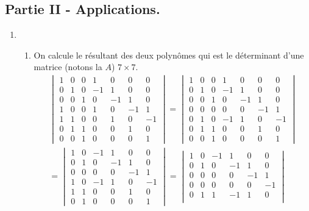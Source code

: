 \subsection*{Partie II - Applications.}
\begin{enumerate}
 \item 
\begin{enumerate}
 \item On calcule le résultant des deux polynômes qui est le déterminant d'une matrice (notons la $A$) $7\times 7$.
\begin{multline*}
 \begin{vmatrix}
1 & 0 & 0 & 1  & 0  & 0  & 0 \\
0 & 1 & 0 & -1 & 1  & 0  & 0 \\
0 & 0 & 1 & 0  & -1 & 1  & 0 \\
1 & 0 & 0 & 1  & 0  & -1 & 1 \\
1 & 1 & 0 & 0  & 1  & 0  & -1 \\
0 & 1 & 1 & 0  & 0  & 1  & 0 \\
0 & 0 & 1 & 0  & 0  & 0  & 1
 \end{vmatrix}
=
 \begin{vmatrix}
1 & 0 & 0 & 1  & 0  & 0  & 0 \\
0 & 1 & 0 & -1 & 1  & 0  & 0 \\
0 & 0 & 1 & 0  & -1 & 1  & 0 \\
0 & 0 & 0 & 0  & 0  & -1 & 1 \\
0 & 1 & 0 & -1 & 1  & 0  & -1 \\
0 & 1 & 1 & 0  & 0  & 1  & 0 \\
0 & 0 & 1 & 0  & 0  & 0  & 1
 \end{vmatrix} \\
=
 \begin{vmatrix}
 1 & 0 & -1 & 1  & 0  & 0 \\
 0 & 1 & 0  & -1 & 1  & 0 \\
 0 & 0 & 0  & 0  & -1 & 1 \\
 1 & 0 & -1 & 1  & 0  & -1 \\
 1 & 1 & 0  & 0  & 1  & 0 \\
 0 & 1 & 0  & 0  & 0  & 1
 \end{vmatrix}
=
 \begin{vmatrix}
 1 & 0 & -1 & 1  & 0  & 0 \\
 0 & 1 & 0  & -1 & 1  & 0 \\
 0 & 0 & 0  & 0  & -1 & 1 \\
 0 & 0 & 0  & 0  & 0  & -1 \\
 0 & 1 & 1  & -1 & 1  & 0 \\

\end{vmatrix}
\end{multline*}
\end{enumerate}
\end{enumerate}

